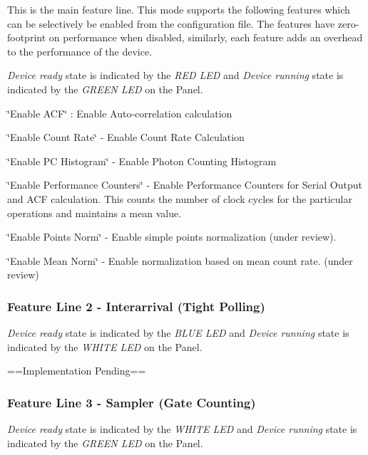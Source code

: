 This is the main feature line. This mode supports the following features which can be selectively be enabled from the configuration file. The features have zero-\/footprint on performance when disabled, similarly, each feature adds an overhead to the performance of the device.

{\itshape Device ready} state is indicated by the {\itshape R\+ED L\+ED} and {\itshape Device running} state is indicated by the {\itshape G\+R\+E\+EN L\+ED} on the Panel.


\begin{DoxyItemize}
\item {\ttfamily \char`\"{}\+Enable A\+C\+F\char`\"{}} \+: Enable Auto-\/correlation calculation
\item {\ttfamily \char`\"{}\+Enable Count Rate\char`\"{}} -\/ Enable Count Rate Calculation
\item {\ttfamily \char`\"{}\+Enable P\+C Histogram\char`\"{}} -\/ Enable Photon Counting Histogram
\item {\ttfamily \char`\"{}\+Enable Performance Counters\char`\"{}} -\/ Enable Performance Counters for Serial Output and A\+CF calculation. This counts the number of clock cycles for the particular operations and maintains a mean value. 


\item {\ttfamily \char`\"{}\+Enable Points Norm\char`\"{}} -\/ Enable simple points normalization (under review).
\item {\ttfamily \char`\"{}\+Enable Mean Norm\char`\"{}} -\/ Enable normalization based on mean count rate. (under review)
\end{DoxyItemize}

\subsubsection*{Feature Line 2 -\/ {\ttfamily Interarrival} (Tight Polling)}

{\itshape Device ready} state is indicated by the {\itshape B\+L\+UE L\+ED} and {\itshape Device running} state is indicated by the {\itshape W\+H\+I\+TE L\+ED} on the Panel.

==Implementation Pending==

\subsubsection*{Feature Line 3 -\/ {\ttfamily Sampler} (Gate Counting)}

{\itshape Device ready} state is indicated by the {\itshape W\+H\+I\+TE L\+ED} and {\itshape Device running} state is indicated by the {\itshape G\+R\+E\+EN L\+ED} on the Panel.


